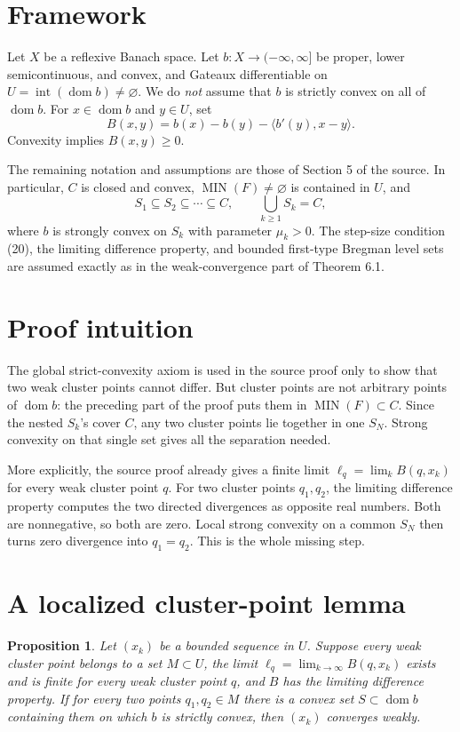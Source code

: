\documentclass[11pt]{article}
\newtheorem*{proposition}{Proposition}
\newcommand{\MIN}{\operatorname{MIN}}
\newcommand{\domm}{\operatorname{dom}}
\begin{document}
\section*{Framework}

Let \(X\) be a reflexive Banach space. Let
\(b:X\to(-\infty,\infty]\) be proper, lower semicontinuous, and convex, and
Gateaux differentiable on \(U=\operatorname{int}(\domm b)\neq\varnothing\).
We do \emph{not} assume that \(b\) is strictly convex on all of \(\domm b\).
For \(x\in\domm b\) and \(y\in U\), set
\[
 B(x,y)=b(x)-b(y)-\langle b'(y),x-y\rangle.
\]
Convexity implies \(B(x,y)\geq0\).

The remaining notation and assumptions are those of Section 5 of the source.
In particular, \(C\) is closed and convex, \(\MIN(F)\neq\varnothing\) is
contained in \(U\), and
\[
 S_1\subseteq S_2\subseteq\cdots\subseteq C,
 \qquad \bigcup_{k\geq1}S_k=C,
\]
where \(b\) is strongly convex on \(S_k\) with parameter \(\mu_k>0\).
The step-size condition (20), the limiting difference property, and bounded
first-type Bregman level sets are assumed exactly as in the weak-convergence
part of Theorem 6.1.

\section*{Proof intuition}

The global strict-convexity axiom is used in the source proof only to show
that two weak cluster points cannot differ. But cluster points are not
arbitrary points of \(\domm b\): the preceding part of the proof puts them in
\(\MIN(F)\subset C\). Since the nested \(S_k\)'s cover \(C\), any two cluster
points lie together in one \(S_N\). Strong convexity on that single set gives
all the separation needed.

More explicitly, the source proof already gives a finite limit
\(\ell_q=\lim_k B(q,x_k)\) for every weak cluster point \(q\). For two cluster
points \(q_1,q_2\), the limiting difference property computes the two directed
divergences as opposite real numbers. Both are nonnegative, so both are zero.
Local strong convexity on a common \(S_N\) then turns zero divergence into
\(q_1=q_2\). This is the whole missing step.

\section*{A localized cluster-point lemma}

\begin{proposition}
Let \((x_k)\) be a bounded sequence in \(U\). Suppose every weak cluster point
belongs to a set \(M\subset U\), the limit
\(
\ell_q=\lim_{k\to\infty}B(q,x_k)
\)
exists and is finite for every weak cluster point \(q\), and \(B\) has the
limiting difference property. If for every two points \(q_1,q_2\in M\) there
is a convex set \(S\subset\domm b\) containing them on which \(b\) is strictly
convex, then \((x_k)\) converges weakly.
\end{proposition}
\end{document}
